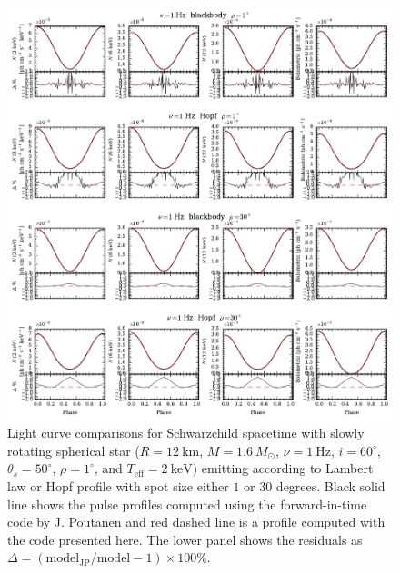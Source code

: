 \documentclass[iop, usenatbib]{emulateapj}
\newcommand{\Msun}{\ensuremath{M_{\odot}}}
\begin{document}
\begin{figure}
\centering
\includegraphics[width=18cm]{figs/fig2a.pdf}
\caption{\label{fig:sch_comp1}
  Light curve comparisons for Schwarzchild spacetime with slowly rotating spherical star ($R = 12~\mathrm{km}$, $M = 1.6~\Msun$, $\nu = 1~\mathrm{Hz}$, $i = 60^{\circ}$, $\theta_s = 50^{\circ}$, $\rho = 1^{\circ}$, and $T_{\mathrm{eff}} = 2~\mathrm{keV}$) emitting according to Lambert law or Hopf profile with spot size either $1$ or $30$ degrees.
  Black solid line shows the pulse profiles computed using the forward-in-time code by J. Poutanen and red dashed line is a profile computed with the code presented here.
  The lower panel shows the residuals as $\Delta = (\mathrm{model_{JP}}/\mathrm{model} -1) \times 100\%$.
}
\end{figure}
\end{document}
